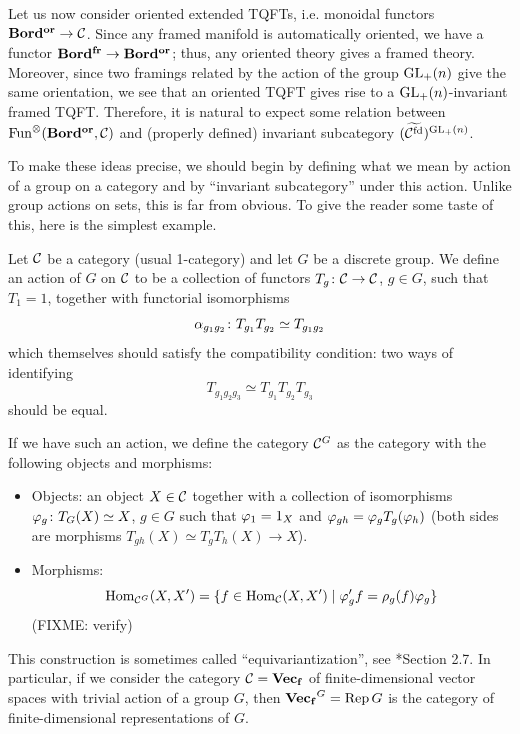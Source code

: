 Let us now consider oriented extended TQFTs, i.e. monoidal functors $\mathbf{Bord^{or}}\to
\mathcal{C}$. Since any framed manifold is automatically oriented, we have a functor
$\mathbf{Bord^{fr}}\to\mathbf{Bord^{or}}$; thus, any oriented theory  gives a framed
  theory. Moreover, since  two framings related by the action of the group
$\mathrm{GL}_+(n)$ give the same orientation, we see that an oriented TQFT gives rise to
a $\mathrm{GL}_+(n)$-invariant framed TQFT. Therefore, it is natural to expect some
relation between $\operatorname{Fun}^{\otimes}(\mathbf{Bord^{or}}, \mathcal{C})$ and (properly defined)
invariant subcategory $(\widetilde{\mathcal{C}^{{\mathrm{fd}}}})^{\mathrm{GL}_+(n)}$.

To make these ideas precise, we should begin by defining what we mean by action
of a group on a category and by ``invariant subcategory'' under this action.
Unlike group actions on sets, this is far from  obvious. To give the reader some
taste of this, here is the simplest example.

\begin{example}\label{x:group-action-1cat}
  Let $\mathcal{C}$ be a category (usual 1-category) and let $G$ be a discrete group.
  We define an action of $G$ on $\mathcal{C}$ to be a collection of functors
  $T_g\colon \mathcal{C}\to \mathcal{C}$, $ g\in G$, such that $T_1 = 1$, together
  with functorial isomorphisms
  $$
    \alpha_{g_1g_2}\colon  T_{g_1}T_{g_2}\simeq T_{g_1g_2}
  $$
  which themselves should satisfy the  compatibility condition: two ways of
  identifying
  $$
    T_{g_1g_2g_3}\simeq T_{g_1}T_{g_2}T_{g_3}
  $$
  should be equal.

  If we have such an action, we define the category $\mathcal{C}^G$ as the category
  with the following objects and morphisms:
  \begin{itemize}
    \item Objects: an object $X\in \mathcal{C}$ together with a collection of
    isomorphisms $\varphi_g\colon T_G(X)\simeq X$, $g\in G$ such that
    $\varphi_1=1_X$ and $\varphi_{gh}=\varphi_g  T_g (\varphi_h)$ (both sides are morphisms
    $T_{gh}(X)\simeq T_{g}T_h(X)\to X$).
    \item Morphisms:
    $$
    \operatorname{Hom}_{\mathcal{C}^G}(X, X')=\{f\in \operatorname{Hom}_{\mathcal{C}} (X,X')\; | \; \varphi'_g f = \rho_g(f)
    \varphi_g\}
    $$
    (FIXME: verify)
  \end{itemize}
  This construction is sometimes called ``equivariantization'', see
  *{Section 2.7}.
  In particular, if we consider the category $\mathcal{C}=\mathbf{Vec_f}$ of finite-dimensional
  vector spaces with trivial action of a group $G$, then $\mathbf{Vec_f}^G=\operatorname{Rep} G$ is the
  category of finite-dimensional representations of $G$.
\end{example}



